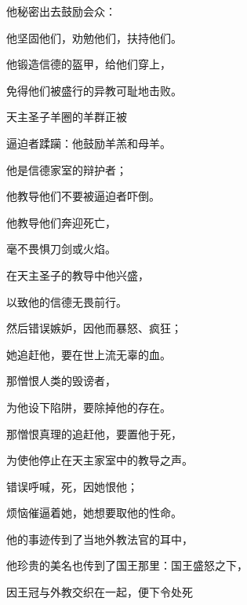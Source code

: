 他秘密出去鼓励会众：\par

他坚固他们，劝勉他们，扶持他们。\par

他锻造信德的盔甲，给他们穿上，\par

免得他们被盛行的异教可耻地击败。\par

天主圣子羊圈的羊群正被\par

逼迫者蹂躏：他鼓励羊羔和母羊。\par

他是信德家室的辩护者；\par

他教导他们不要被逼迫者吓倒。\par

他教导他们奔迎死亡，\par

毫不畏惧刀剑或火焰。\par

在天主圣子的教导中他兴盛，\par

以致他的信德无畏前行。\par

然后错误嫉妒，因他而暴怒、疯狂；\par

她追赶他，要在世上流无辜的血。\par

那憎恨人类的毁谤者，\par

为他设下陷阱，要除掉他的存在。\par

那憎恨真理的追赶他，要置他于死，\par

为使他停止在天主家室中的教导之声。\par

错误呼喊，死，因她恨他；\par

烦恼催逼着她，她想要取他的性命。\par

他的事迹传到了当地外教法官的耳中，\par

他珍贵的美名也传到了国王那里：国王盛怒之下，\par

因王冠与外教交织在一起，便下令处死\par

